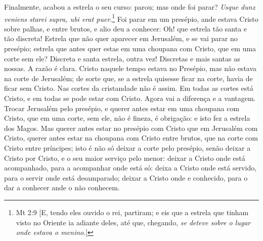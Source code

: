Finalmente, acabou a estrela o seu curso: parou; mas onde foi parar?
\emph{Usque dunz veniens starei supra, ubi erat puer}.\footnote{Mt 2:9 [E, tendo eles ouvido o rei, partiram; e eis que a estrela que tinham visto no Oriente ia
adiante deles, até que, chegando, \emph{se deteve sobre o lugar onde estava o menino}.]} Foi
parar em um presépio, ande estava Cristo sobre palhas, e entre brutos, e
alio deu a conhecer: Oh! que estrela tão santa e tão discreta! Estrela
que não quer aparecer em Jerusalém, e se vai parar no presépio; estrela
que antes quer estas em uma choupana com Cristo, que em uma corte sem
ele? Discreta e santa estrela, outra vez! Discretas e mais santas as
nossas. A razão é clara. Cristo naquele tempo estava no Presépio, mas
não estava na corte de Jerusalém; de sorte que, se a estrela quisesse
ficar na corte, havia de ficar sem Cristo. Nas cortes da cristandade não
é assim. Em todas as cortes está Cristo, e em todas se pode estar com
Cristo. Agora vai a diferença e a vantagem. Trocar Jerusalém pelo
presépio, e querer antes estar em uma choupana com Cristo, que em uma
corte, sem ele, não é fineza, é obrigação: e isto fez a estrela dos
Magos. Mas querer antes estar no presépio com Cristo que em Jerusalém
com Cristo, querer antes estar na choupana com Cristo entre brutos, que
na corte com Cristo entre príncipes; isto é não só deixar a corte pelo
presépio, senão deixar a Cristo por Cristo, e o seu maior serviço pelo
menor: deixar a Cristo onde está acompanhado, para a acompanhar onde
está só: deixa a Cristo onde
está servido, para o servir onde está desamparado; deixar a Cristo onde
e conhecido, para o dar a conhecer ande o não conhecem.

